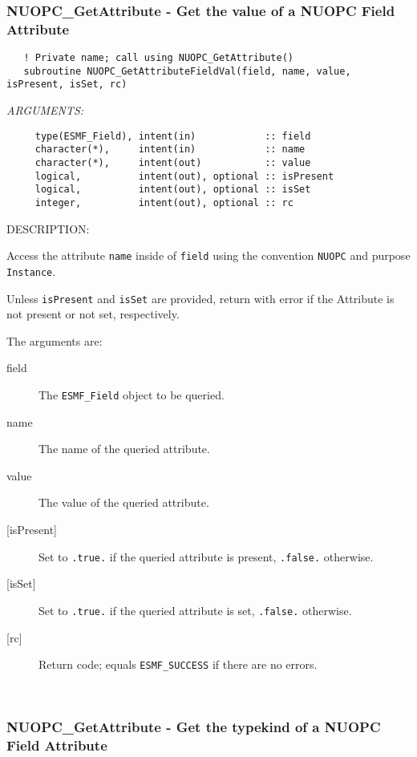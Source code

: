 \subsubsection [NUOPC\_GetAttribute] {NUOPC\_GetAttribute - Get the value of a NUOPC Field Attribute}


\begin{verbatim}   ! Private name; call using NUOPC_GetAttribute()
   subroutine NUOPC_GetAttributeFieldVal(field, name, value, isPresent, isSet, rc)\end{verbatim}{\em ARGUMENTS:}
\begin{verbatim}     type(ESMF_Field), intent(in)            :: field
     character(*),     intent(in)            :: name
     character(*),     intent(out)           :: value
     logical,          intent(out), optional :: isPresent
     logical,          intent(out), optional :: isSet
     integer,          intent(out), optional :: rc\end{verbatim}
{\sf DESCRIPTION:\\ }


     Access the attribute {\tt name} inside of {\tt field} using the
     convention {\tt NUOPC} and purpose {\tt Instance}.
  
     Unless {\tt isPresent} and {\tt isSet} are provided, return with error if 
     the Attribute is not present or not set, respectively.
  
     The arguments are:
     \begin{description}
     \item[field]
       The {\tt ESMF\_Field} object to be queried.
     \item[name]
       The name of the queried attribute.
     \item[value]
       The value of the queried attribute.
     \item[{[isPresent]}]
       Set to {\tt .true.} if the queried attribute is present, {\tt .false.}
       otherwise.
     \item[{[isSet]}]
       Set to {\tt .true.} if the queried attribute is set, {\tt .false.}
       otherwise.
     \item[{[rc]}]
       Return code; equals {\tt ESMF\_SUCCESS} if there are no errors.
     \end{description}
   
 
\mbox{}\hrulefill\ 
 
\subsubsection [NUOPC\_GetAttribute] {NUOPC\_GetAttribute - Get the typekind of a NUOPC Field Attribute}



